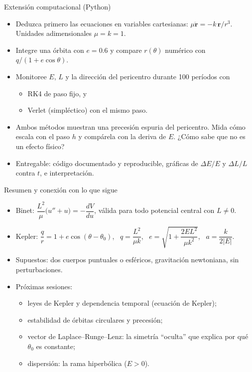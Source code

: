 \documentclass[spanish]{beamer}
\newcommand{\vr}{\mathbf r}
\begin{document}
\begin{frame}{Extensión computacional (Python)}
\begin{itemize}
\item<1-> Deduzca primero las ecuaciones en variables cartesianas: $\mu\ddot{\vr}=-k\,\vr/r^3$. Unidades adimensionales $\mu=k=1$.
\item<2-> Integre una órbita con $e=0.6$ y compare $r(\theta)$ numérico con $q/(1+e\cos\theta)$.
\item<3-> Monitoree $E$, $L$ y la dirección del pericentro durante 100 períodos con
  \begin{itemize}
  \item RK4 de paso fijo, y
  \item Verlet (simpléctico) con el mismo paso.
  \end{itemize}
\item<4-> Ambos métodos muestran una \alert{precesión espuria} del pericentro. Mida cómo escala con el paso $h$ y compárela con la deriva de $E$. ¿Cómo sabe que no es un efecto físico?
\item<5-> Entregable: código documentado y reproducible, gráficas de $\Delta E/E$ y $\Delta L/L$ contra $t$, e interpretación.
\end{itemize}
\end{frame}

\begin{frame}{Resumen y conexión con lo que sigue}
\begin{itemize}
\item<1-> Binet: $\dfrac{L^2}{\mu}\big(u''+u\big)=-\dfrac{dV}{du}$, válida para todo potencial central con $L\neq0$.
\item<2-> Kepler: $\dfrac{q}{r}=1+e\cos(\theta-\theta_0)$, \ $q=\dfrac{L^2}{\mu k}$, \ $e=\sqrt{1+\dfrac{2EL^2}{\mu k^2}}$, \ $a=\dfrac{k}{2|E|}$.
\item<3-> Supuestos: dos cuerpos puntuales o esféricos, gravitación newtoniana, sin perturbaciones.
\item<4-> Próximas sesiones:
  \begin{itemize}
  \item leyes de Kepler y dependencia temporal (ecuación de Kepler);
  \item estabilidad de órbitas circulares y precesión;
  \item vector de Laplace--Runge--Lenz: la simetría ``oculta'' que explica por qué $\theta_0$ es constante;
  \item dispersión: la rama hiperbólica ($E>0$).
  \end{itemize}
\end{itemize}
\end{frame}
\end{document}

